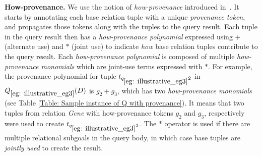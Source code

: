 \textbf{How-provenance.} We use the notion of {\em how-provenance} introduced in~\cite{green2007provenance}. It starts by annotating each base relation tuple with a unique {\em provenance token}, and propagates those tokens along with the tuples to the query result.  Each tuple in the query result then has a {\em how-provenance polynomial} expressed using $+$ (alternate use) and $*$ (joint use) to indicate {\em how} base relation tuples contribute to the query result. Each {\em how-provenance polynomial} is composed of multiple {\em how-provenance monomials} which are joint-use terms expressed with $*$. For example, the provenance polynomial for tuple $t_{q_{\ref{eg: illustrative_eg3}}2}$ in $Q_{\ref{eg: illustrative_eg3}}(D)$  is $g_2 + g_3$, which has two \textit{how-provenance monomials} (see Table \ref{Table: Sample instance of Q with provenance}). It means that two tuples from relation {\em Gene} with how-provenance tokens $g_2$ and $g_3$, respectively
were used to create $t_{q_{\ref{eg: illustrative_eg3}}2}$.  The $*$ operator is used if there are multiple relational subgoals in the query body, in which case base tuples are {\em jointly used} to create the result.

